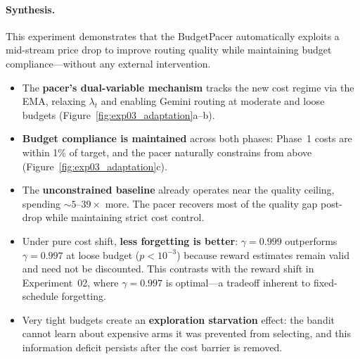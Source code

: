 \paragraph{Synthesis.}
This experiment demonstrates that the BudgetPacer automatically
exploits a mid-stream price drop to improve routing quality while
maintaining budget compliance---without any external intervention.
\begin{itemize}[nosep,leftmargin=*]
  \item The \textbf{pacer's dual-variable mechanism} tracks the
    new cost regime via the EMA, relaxing $\lambda_t$ and enabling
    Gemini routing at moderate and loose budgets
    (Figure~\ref{fig:exp03_adaptation}a--b).
  \item \textbf{Budget compliance is maintained} across both phases:
    Phase~1 costs are within 1\% of target, and the pacer naturally
    constrains from above (Figure~\ref{fig:exp03_adaptation}c).
  \item The \textbf{unconstrained baseline} already operates near the
    quality ceiling, spending ${\sim}5$--$39\times$ more.
    The pacer recovers most of the quality gap post-drop while
    maintaining strict cost control.
  \item Under pure cost shift, \textbf{less forgetting is better}:
    $\gamma{=}0.999$ outperforms $\gamma{=}0.997$ at loose budget
    ($p < 10^{-3}$) because reward estimates remain valid and
    need not be discounted.
    This contrasts with the reward shift in Experiment~02, where
    $\gamma{=}0.997$ is optimal---a tradeoff inherent to
    fixed-schedule forgetting.
  \item Very tight budgets create an \textbf{exploration starvation}
    effect: the bandit cannot learn about expensive arms it was
    prevented from selecting, and this information deficit persists
    after the cost barrier is removed.
\end{itemize}
